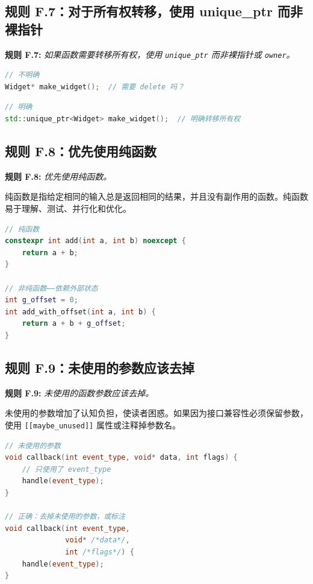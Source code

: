 \subsection{规则 F.7：对于所有权转移，使用 unique\_ptr 而非裸指针}

\textbf{规则 F.7:} \textit{如果函数需要转移所有权，使用 \texttt{unique\_ptr} 而非裸指针或 \texttt{owner}。}

\begin{lstlisting}[language=C++]
// 不明确
Widget* make_widget();  // 需要 delete 吗？
\end{lstlisting}

\begin{lstlisting}[language=C++]
// 明确
std::unique_ptr<Widget> make_widget();  // 明确转移所有权
\end{lstlisting}

\subsection{规则 F.8：优先使用纯函数}

\textbf{规则 F.8:} \textit{优先使用纯函数。}

纯函数是指给定相同的输入总是返回相同的结果，并且没有副作用的函数。纯函数易于理解、测试、并行化和优化。

\begin{lstlisting}[language=C++]
// 纯函数
constexpr int add(int a, int b) noexcept {
    return a + b;
}

// 非纯函数——依赖外部状态
int g_offset = 0;
int add_with_offset(int a, int b) {
    return a + b + g_offset;
}
\end{lstlisting}

\subsection{规则 F.9：未使用的参数应该去掉}

\textbf{规则 F.9:} \textit{未使用的函数参数应该去掉。}

未使用的参数增加了认知负担，使读者困惑。如果因为接口兼容性必须保留参数，使用 \texttt{[[maybe\_unused]]} 属性或注释掉参数名。

\begin{lstlisting}[language=C++]
// 未使用的参数
void callback(int event_type, void* data, int flags) {
    // 只使用了 event_type
    handle(event_type);
}

// 正确：去掉未使用的参数，或标注
void callback(int event_type,
              void* /*data*/,
              int /*flags*/) {
    handle(event_type);
}
\end{lstlisting}

